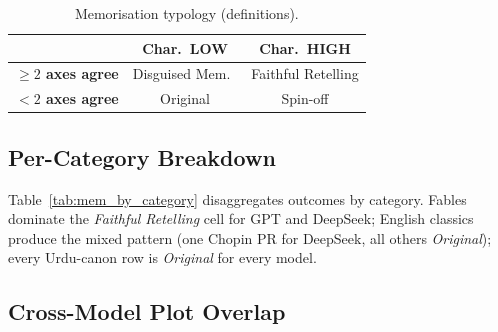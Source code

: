 \documentclass[11pt]{article}
\begin{document}
\begin{table}[h]
\centering\small
\caption{Memorisation typology (definitions).}
\label{tab:memorisation_typology}
\begin{tabular}{lcc}
\hline
                            & \textbf{Char.\ LOW} & \textbf{Char.\ HIGH} \\
\hline
\textbf{$\geq 2$ axes agree} & Disguised Mem.\ & Faithful Retelling \\
\textbf{$< 2$ axes agree}    & Original         & Spin-off \\
\hline
\end{tabular}
\end{table}

\subsection{Per-Category Breakdown}
\label{app:memorisation_breakdown}

Table~\ref{tab:mem_by_category} disaggregates outcomes by
category. Fables dominate the \emph{Faithful Retelling}
cell for GPT and DeepSeek; English classics produce the
mixed pattern (one Chopin PR for DeepSeek, all others
\emph{Original}); every Urdu-canon row is \emph{Original}
for every model.

\begin{table}[h]
\centering\small
\caption{Memorisation label counts by category and model.
PR = Plot Reproduction; PI = Partial Inheritance;
OR = Original.}
\label{tab:mem_by_category}
\end{table}

\subsection{Cross-Model Plot Overlap}
\label{app:memorisation_cross_model}
\end{document}
